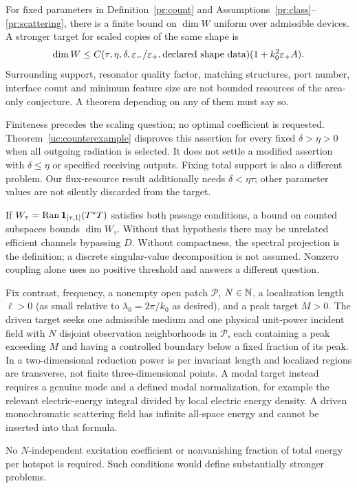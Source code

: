 \begin{conjecture}\label{pr:channel-target}
For fixed parameters in Definition~\ref{pr:count} and Assumptions~\ref{pr:class}--\ref{pr:scattering}, there is a finite bound on $\dim W$ uniform over admissible devices. A stronger target for scaled copies of the same shape is
\begin{equation}\label{pr:area-bound}
 \dim W\leq C(\tau,\eta,\delta,\varepsilon_-/\varepsilon_+,\text{declared shape data})
                 (1+k_0^2\varepsilon_+A).
\end{equation}
Surrounding support, resonator quality factor, matching structures, port number, interface count and minimum feature size are not bounded resources of the area-only conjecture. A theorem depending on any of them must say so.
\end{conjecture}
Finiteness precedes the scaling question; no optimal coefficient is requested. Theorem~\ref{uc:counterexample} disproves this assertion for every fixed $\delta>\eta>0$ when all outgoing radiation is selected. It does not settle a modified assertion with $\delta\leq\eta$ or specified receiving outputs. Fixing total support is also a different problem. Our flux-resource result additionally needs $\delta<\eta\tau$; other parameter values are not silently discarded from the target.

If $W_\tau=\operatorname{Ran}\mathbf1_{[\tau,1]}(T^*T)$ satisfies both passage conditions, a bound on counted subspaces bounds $\dim W_\tau$. Without that hypothesis there may be unrelated efficient channels bypassing $D$. Without compactness, the spectral projection is the definition; a discrete singular-value decomposition is not assumed. Nonzero coupling alone uses no positive threshold and answers a different question.

\begin{definition}\label{pr:hotspot-target}
Fix contrast, frequency, a nonempty open patch $\mathcal P$, $N\in\mathbb N$, a localization length $\ell>0$ (as small relative to $\lambda_0=2\pi/k_0$ as desired), and a peak target $M>0$. The driven target seeks one admissible medium and one physical unit-power incident field with $N$ disjoint observation neighborhoods in $\mathcal P$, each containing a peak exceeding $M$ and having a controlled boundary below a fixed fraction of its peak. In a two-dimensional reduction power is per invariant length and localized regions are transverse, not finite three-dimensional points. A modal target instead requires a genuine mode and a defined modal normalization, for example the relevant electric-energy integral divided by local electric energy density. A driven monochromatic scattering field has infinite all-space energy and cannot be inserted into that formula.
\end{definition}
No $N$-independent excitation coefficient or nonvanishing fraction of total energy per hotspot is required. Such conditions would define substantially stronger problems.

